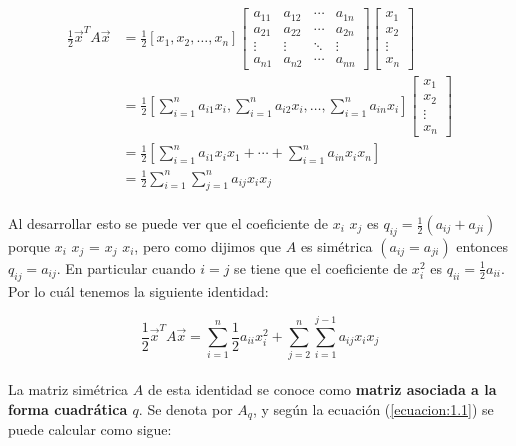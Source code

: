 \begin{align*}
\frac{1}{2} \overrightarrow{x}^{T} A \overrightarrow{x} &= \frac{1}{2}[x_{1}, x_{2},\ldots,x_{n}] 
\begin{bmatrix}
a_{11} & a_{12} & \cdots & a_{1n}\\
a_{21} & a_{22} & \cdots & a_{2n}\\
\vdots & \vdots & \ddots & \vdots \\
a_{n1} & a_{n2} & \cdots & a_{nn}
\end{bmatrix} 
\begin{bmatrix}
x_{1}\\
x_{2}\\
\vdots\\
x_{n}
\end{bmatrix} \\ 
&= \frac{1}{2} \left[\sum_{i=1}^{n} a_{i1}x_{i}, \sum_{i=1}^{n} a_{i2}x_{i}, \ldots , \sum_{i=1}^{n} a_{in}x_{i} \right] 
\begin{bmatrix}
x_{1}\\
x_{2}\\
\vdots\\
x_{n}
\end{bmatrix} \\ 
&=   \frac{1}{2} \left[\sum_{i=1}^{n} a_{i1}x_{i}x_{1} + \cdots + \sum_{i=1}^{n} a_{in}x_{i}x_{n}\right]\\ 
&=   \frac{1}{2} \sum_{i=1}^{n}\sum_{j=1}^{n} a_{ij}x_{i}x_{j}
\end{align*}

\paragraph*{}
Al desarrollar esto se puede ver que el coeficiente de $x_{i}$ $x_{j}$ es $q_{ij} = \frac{1}{2} \left(a_{ij} + a_{ji} \right)$ porque $x_{i}$ $x_{j}$ = $x_{j}$ $x_{i}$, pero como dijimos que $A$ es simétrica $\left( a_{ij} = a_{ji}\right)$ entonces $q_{ij} = a_{ij}$. En particular cuando $i = j$ se tiene que el coeficiente de $x_{i}^{2}$ es $q_{ii} = \frac{1}{2}a_{ii}$. Por lo cuál tenemos la siguiente identidad:

\begin{equation}
    \frac{1}{2} \overrightarrow{x}^{T} A \overrightarrow{x} = \sum_{i=1}^{n}\frac{1}{2} a_{ii}x_{i}^{2} + \sum_{j=2}^{n}\sum_{i=1}^{j-1} a_{ij}x_{i}x_{j}
    \label{ecuacion:1.1}
\end{equation}

\paragraph*{}
La matriz simétrica $A$ de esta identidad se conoce como \textbf{matriz asociada a la forma cuadrática $q$}. Se denota por \textbf{$A_{q}$}, y según la ecuación (\ref{ecuacion:1.1}) se puede calcular como sigue:

